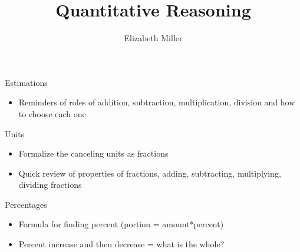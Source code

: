 \documentclass{ximera}
\author{Elizabeth Miller}
\title{Quantitative Reasoning}
\begin{document}
\begin{abstract}
\end{abstract}
\maketitle


\begin{objectives}

\item Estimations
\begin{itemize}
	\item Reminders of roles of addition, subtraction, multiplication, division and how to choose each one
\end{itemize}

\item Units 
\begin{itemize}
	\item Formalize the canceling units as fractions
	\item Quick review of properties of fractions, adding, subtracting, multiplying, dividing fractions
\end{itemize}

\item Percentages
\begin{itemize}
	\item Formula for finding percent (portion = amount*percent)
	\item Percent increase and then decrease = what is the whole?
\end{itemize}

\end{objectives}
\end{document}
